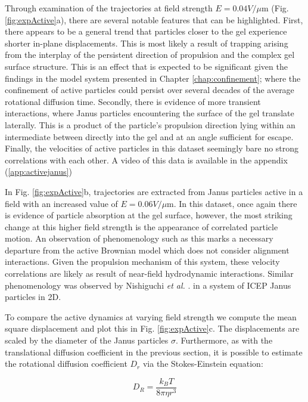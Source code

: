 Through examination of the trajectories at field strength $E = 0.04 V/\mu$m (Fig. \ref{fig:expActive}a), there are several notable features that can be highlighted. First, there appears to be a general trend that particles closer to the gel experience shorter in-plane displacements. This is most likely a result of trapping arising from the interplay of the persistent direction of propulsion and the complex gel surface structure. This is an effect that is expected to be significant given the findings in the model system presented in Chapter \ref{chap:confinement}; where the confinement of active particles could persist over several decades of the average rotational diffusion time.
Secondly, there is evidence of more transient interactions, where Janus particles encountering the surface of the gel translate laterally. This is a product of the particle's propulsion direction lying within an intermediate between directly into the gel and at an angle sufficient for escape. Finally, the velocities of active particles in this dataset seemingly bare no strong correlations with each other. A video of this data is available in the appendix (\ref{app:activejanus})
	
In Fig. \ref{fig:expActive}b, trajectories are extracted from Janus particles active in a field with an increased value of $E = 0.06 V/\mu$m. In this dataset, once again there is evidence of particle absorption at the gel surface, however, the most striking change at this higher field strength is the appearance of correlated particle motion. An observation of phenomenology such as this marks a necessary departure from the active Brownian model which does not consider alignment interactions. Given the propulsion mechanism of this system, these velocity correlations are likely as result of near-field hydrodynamic interactions. Similar phenomenology was observed by Nishiguchi \textit{et al.} \cite{nishiguchi2015}. in a system of ICEP Janus particles in 2D.
	
To compare the active dynamics at varying field strength we compute the mean square displacement and plot this in Fig. \ref{fig:expActive}c. The displacements are scaled by the diameter of the Janus particles $\sigma$. Furthermore, as with the translational diffusion coefficient in the previous section, it is possible to estimate the rotational diffusion coefficient $D_r$ via the Stokes-Einstein equation:

\begin{equation}
	D_R = \frac{k_B T}{8 \pi \eta r^3}
\end{equation}

